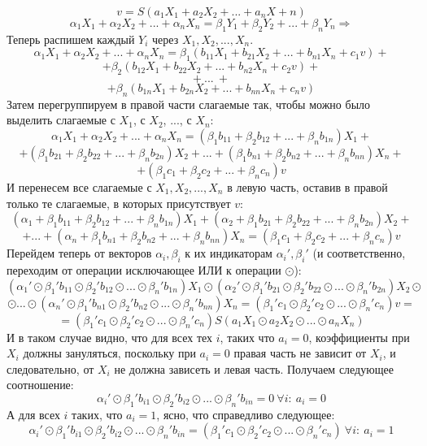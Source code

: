 \documentclass[a4paper,12pt]{extarticle}
\theoremstyle{plain} %
\begin{document}
\begin{large}
$$v = S(a_1X_1 + a_2X_2 + ... + a_nX+n)$$
$$\alpha_1X_1 + \alpha_2X_2 + ... + \alpha_nX_n = \beta_1Y_1 + \beta_2Y_2 + ... + \beta_nY_n \Rightarrow$$
Теперь распишем каждый $Y_i$ через $X_1, X_2, ..., X_n$.
$$\alpha_1X_1 + \alpha_2X_2 + ... + \alpha_nX_n = \beta_1(b_{11}X_1 + b_{21}X_2 + ... + b_{n1}X_n + c_1v) +$$
$$ +  \beta_2(b_{12}X_1 + b_{22}X_2 + ... + b_{n2}X_n + c_2v) +$$
$$+~ ...~ +$$
$$+ \beta_n(b_{1n}X_1 + b_{2n}X_2 + ... + b_{nn}X_n + c_nv) $$
Затем перегруппируем в правой части слагаемые так, чтобы можно было выделить слагаемые с $X_1$, с $X_2$, ..., с $X_n$:
$$\alpha_1X_1 + \alpha_2X_2 + ... + \alpha_nX_n = (\beta_1b_{11} + \beta_2b_{12} + ... + \beta_nb_{1n})X_1 + $$
$$+(\beta_1b_{21} + \beta_2b_{22} + ... + \beta_nb_{2n})X_2 + ... + (\beta_1b_{n1} + \beta_2b_{n2} + ... + \beta_nb_{nn})X_n+$$
$$+ (\beta_1c_1 + \beta_2c_2 + ... + \beta_nc_n)v$$
И перенесем все слагаемые с $X_1, X_2, ..., X_n$ в левую часть, оставив в правой только те слагаемые, в которых присутствует $v$:
$$ (\alpha_1 + \beta_1b_{11} + \beta_2b_{12} + ... + \beta_nb_{1n})X_1 + (\alpha_2 + \beta_1b_{21} + \beta_2b_{22} + ... + \beta_nb_{2n})X_2 + $$
$$+...+ (\alpha_n + \beta_1b_{n1} + \beta_2b_{n2} + ... + \beta_nb_{nn})X_n =  (\beta_1c_1 + \beta_2c_2 + ... + \beta_nc_n)v$$
Перейдем теперь от векторов $\alpha_i, \beta_i$ к их индикаторам $\alpha_i', \beta_i'$ (и соответственно, переходим от операции исключающее ИЛИ к операции $\odot$):
$$ (\alpha_1' \odot \beta_1'b_{11} \odot \beta_2'b_{12} \odot ... \odot \beta_n'b_{1n})X_1 \odot (\alpha_2' \odot \beta_1'b_{21} \odot \beta_2'b_{22} \odot ... \odot \beta_n'b_{2n})X_2 \odot $$
$$\odot...\odot (\alpha_n' \odot \beta_1'b_{n1} \odot \beta_2'b_{n2} \odot ... \odot \beta_n'b_{nn})X_n =  (\beta_1'c_1 \odot \beta_2'c_2 \odot ... \odot \beta_n'c_n)v = $$
\begin{equation}\label{eq:not_final_lin}=(\beta_1'c_1 \odot \beta_2'c_2 \odot ... \odot \beta_n'c_n)S(a_1X_1 \odot a_2X_2 \odot ... \odot a_nX_n)\end{equation}
И в таком случае видно, что для всех тех $i$, таких что $a_i = 0$, коэффициенты при $X_i$ должны зануляться, поскольку при $a_i = 0$ правая часть не зависит от $X_i$, и следовательно, от $X_i$ не должна зависеть и левая часть. Получаем следующее соотношение: 
$$\alpha_i' \odot \beta_1'b_{i1} \odot \beta_2'b_{i2} \odot ... \odot \beta_n'b_{in} = 0 ~ \forall i: ~a_i = 0$$
А для всех $i$ таких, что $a_i = 1$, ясно, что справедливо следующее:
$$\alpha_i' \odot \beta_1'b_{i1} \odot \beta_2'b_{i2} \odot ... \odot \beta_n'b_{in} = (\beta_1'c_1 \odot \beta_2'c_2 \odot ... \odot \beta_n'c_n) ~ \forall i: ~a_i = 1$$

\end{large}
\end{document}
